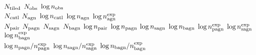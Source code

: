             $N_{\rm tiled}$
               $N_{\rm obs}$
          $\log n_{\rm obs}$
\hline
{}\\
\hline               
	      $N_{\rm cntl}$
	       $N_{\rm agn}$
         $\log n_{\rm cntl}$
          $\log n_{\rm agn}$
$\log n_{\rm agn}^{\rm exp}$
\hline
{}\\
\hline
              $N_{\rm pair}$
              $N_{\rm pagn}$
              $N_{\rm sagn}$
              $N_{\rm bagn}$
         $\log n_{\rm pair}$
         $\log n_{\rm pagn}$
         $\log n_{\rm sagn}$
         $\log n_{\rm bagn}$
$\log n_{\rm pagn}^{\rm exp}$
$\log n_{\rm sagn}^{\rm exp}$
$\log n_{\rm bagn}^{\rm exp}$
\hline
{}\\
\hline
$\log n_{\rm pagn}/n_{\rm pagn}^{\rm exp}$
$\log n_{\rm sagn}/n_{\rm sagn}^{\rm exp}$
$\log n_{\rm bagn}/n_{\rm bagn}^{\rm exp}$
